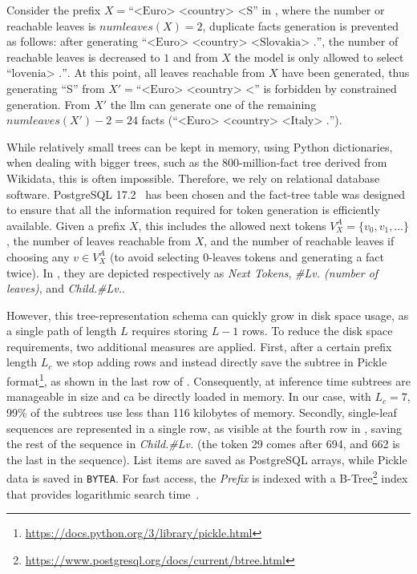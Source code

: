 Consider the prefix $X = \text{``<Euro> <country> <S''}$ in , where the number or reachable leaves is $numleaves(X)=2$, duplicate facts generation is prevented as follows: after generating $\text{``<Euro> <country> <Slovakia> .''}$, the number of reachable leaves is decreased to $1$ and from $X$ the model is only allowed to select $\text{``lovenia> .''}$. At this point, all leaves reachable from $X$ have been generated, thus generating ``S'' from $X'=\text{``<Euro> <country> <''}$ is forbidden by constrained generation. From $X'$ the \ac{llm} can generate one of the remaining $numleaves(X') - 2 = 24$ facts (\eg $\text{``<Euro> <country> <Italy> .''}$). 

While relatively small trees can be kept in memory, \eg using Python dictionaries, when dealing with bigger trees, such as the 800-million-fact tree derived from Wikidata, this is often impossible. Therefore, we rely on relational database software. PostgreSQL 17.2~\cite{postgresql_online} has been chosen and the fact-tree table was designed to ensure that all the information required for token generation is efficiently available.
Given a prefix $X$, this includes the allowed next tokens $V^A_{X} = \{v_0,v_1,\ldots\}$, the number of leaves reachable from $X$, and the number of reachable leaves if choosing any $v \in V^A_{X}$ (to avoid selecting 0-leaves tokens and generating a fact twice). In , they are depicted respectively as \textit{Next Tokens}, \textit{\#Lv. (number of leaves)}, and \textit{Child.\#Lv.}.

However, this tree-representation schema can quickly grow in disk space usage, as a single path of length $L$ requires storing $L-1$ rows. To reduce the disk space requirements, two additional measures are applied. First, after a certain prefix length $L_c$ we stop adding rows and instead directly save the subtree in Pickle format\footnote{\url{https://docs.python.org/3/library/pickle.html}}, as shown in the last row of .
Consequently, at inference time subtrees are manageable in size and ca be directly loaded in memory. In our case, with $L_c = 7$, 99\% of the subtrees use less than 116 kilobytes of memory.
Secondly, single-leaf sequences are represented in a single row, as visible at the fourth row in , saving the rest of the sequence in \textit{Child.\#Lv.} (the token 29 comes after 694, and 662 is the last in the sequence).
%
List items are saved as PostgreSQL arrays, while Pickle data is saved in \texttt{BYTEA}. For fast access, the \textit{Prefix} is indexed with a B-Tree\footnote{\url{https://www.postgresql.org/docs/current/btree.html}} index that provides logarithmic search time~\cite{cormen2022introduction}.



